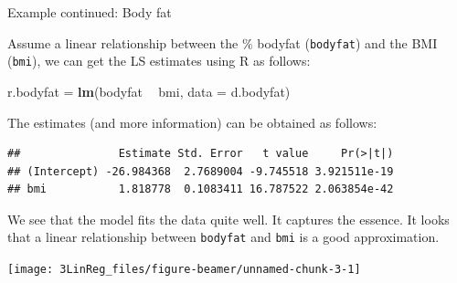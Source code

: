 \documentclass[10pt,ignorenonframetext,]{beamer}
\newenvironment{Shaded}{\begin{snugshade}}{\end{snugshade}}
\newcommand{\KeywordTok}[1]{\textcolor[rgb]{0.13,0.29,0.53}{\textbf{#1}}}
\newcommand{\DataTypeTok}[1]{\textcolor[rgb]{0.13,0.29,0.53}{#1}}
\newcommand{\StringTok}[1]{\textcolor[rgb]{0.31,0.60,0.02}{#1}}
\newcommand{\OperatorTok}[1]{\textcolor[rgb]{0.81,0.36,0.00}{\textbf{#1}}}
\newcommand{\NormalTok}[1]{#1}
\begin{document}
\begin{frame}[fragile]

\begin{block}{Example continued: Body fat}

\vspace{2mm}

Assume a linear relationship between the \% bodyfat (\texttt{bodyfat})
and the BMI (\texttt{bmi}), we can get the LS estimates using R as
follows:

\scriptsize

\begin{Shaded}
\begin{Highlighting}[]
\NormalTok{r.bodyfat =}\StringTok{ }\KeywordTok{lm}\NormalTok{(bodyfat }\OperatorTok{~}\StringTok{ }\NormalTok{bmi, }\DataTypeTok{data =}\NormalTok{ d.bodyfat)}
\end{Highlighting}
\end{Shaded}

\normalsize
The estimates (and more information) can be obtained as follows:

\scriptsize

\begin{Shaded}
\end{Shaded}

\begin{verbatim}
##               Estimate Std. Error   t value     Pr(>|t|)
## (Intercept) -26.984368  2.7689004 -9.745518 3.921511e-19
## bmi           1.818778  0.1083411 16.787522 2.063854e-42
\end{verbatim}

\end{block}

\end{frame}

\begin{frame}[fragile]

We see that the model fits the data quite well. It captures the essence.
It looks that a linear relationship between \texttt{bodyfat} and
\texttt{bmi} is a good approximation.

\begin{center}\texttt{[image: 3LinReg\_files/figure-beamer/unnamed-chunk-3-1]} \end{center}

\end{frame}
\end{document}
